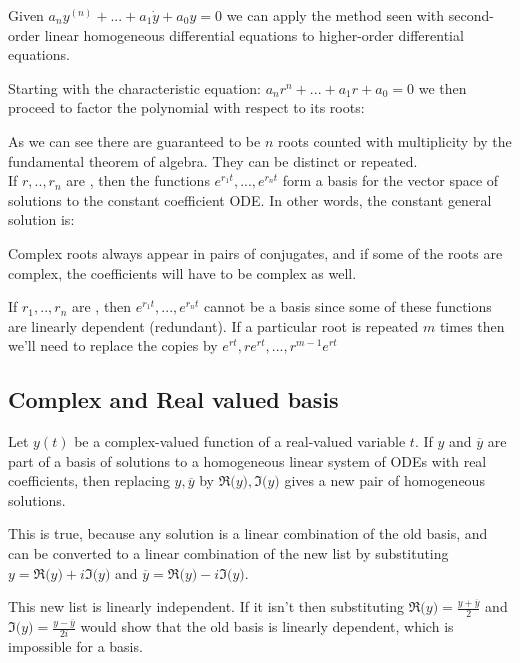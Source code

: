 \documentclass[11pt, openright]{book}
\begin{document}
Given $a_ny^{(n)}+...+a_1\dot{y}+a_0y=0$ we can apply the method seen with second-order linear homogeneous differential equations to higher-order differential equations.

Starting with the characteristic equation: $a_nr^n+...+a_1r+a_0=0$ we then proceed to factor the polynomial with respect to its roots: \vspace{-2mm}

As we can see there are guaranteed to be $n$ roots counted with multiplicity by the fundamental theorem of algebra. They can be distinct or repeated.\\
If $r,..,r_n$ are , then the functions $e^{r_1t}, ...,e^{r_nt}$ form a basis for the vector space of solutions to the constant coefficient ODE. In other words, the constant general solution is:

Complex roots always appear in pairs of conjugates, and if some of the roots are complex, the coefficients will have to be complex as well.

If $r_1,..,r_n$ are , then $e^{r_1t}, ...,e^{r_nt}$ cannot be a basis since some of these functions are linearly dependent (redundant). If a particular root is repeated $m$ times then we'll need to replace the copies by $e^{rt}, re^{rt}, ..., r^{m-1}e^{rt}$

\subsection{Complex and Real valued basis}

Let $y(t)$ be a complex-valued function of a real-valued variable $t$. If $y$ and $\overline{y}$ are part of a
basis of solutions to a homogeneous linear system of ODEs with real coefficients, then replacing $y,\overline{y}$ by $\Re\big(y\big),\Im\big(y\big)$ gives a new pair of homogeneous solutions.

This is true, because any solution is a linear combination of the old basis, and can be converted to a linear combination of the new list by substituting $y=\Re\big(y\big)+i\Im\big(y\big)$ and $\overline{y}=\Re\big(y\big)-i\Im\big(y\big)$.

This new list is linearly independent. If it isn't then substituting $\Re\big(y\big)=\frac{y+\overline{y}}{2}$ and $\Im\big(y\big)=\frac{y-\overline{y}}{2i}$ would show that the old basis is linearly dependent, which is impossible for a basis.
\end{document}
